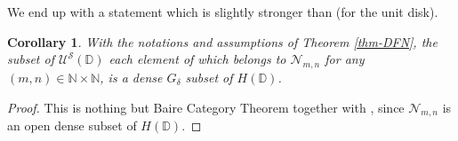 \documentclass[12pt]{amsart}
\numberwithin{equation}{section}
\newtheorem{corollary}[theorem]{Corollary}
\begin{document}
We end up with a statement which is slightly stronger than \cite[Theorem 3.1]{DFN} (for the unit disk).

\begin{corollary}With the notations and assumptions of Theorem \ref{thm-DFN}, the subset of ${\mathcal U} ^{\mathcal{S}}({\mathbb D})$ each element of which belongs to ${\mathcal N} _{m,n}$ for any $(m,n)\in {\mathbb{N}} \times {\mathbb{N}}$, is a dense $G_{\delta}$ subset of $H({\mathbb D})$.
\end{corollary}

\begin{proof}This is nothing but Baire Category Theorem together with \cite[Theorem 3.1]{DFN}, since ${\mathcal N}_{m,n}$ is an open dense subset of $H({\mathbb D})$.
\end{proof}
\end{document}
